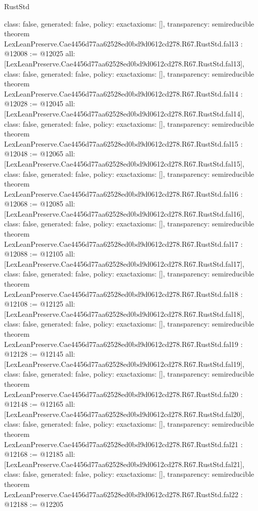 \begin{lexlean}{RustStd}
\begin{coremodule}
{  class: false,
  generated: false,
  policy: exact{axioms: []},
  transparency: semireducible
}
theorem LexLeanPreserve.Cae4456d77aa62528ed0bd9d0612cd278.R67.RustStd.fal13 : @12008 := @12025 {
  all: [LexLeanPreserve.Cae4456d77aa62528ed0bd9d0612cd278.R67.RustStd.fal13],
  class: false,
  generated: false,
  policy: exact{axioms: []},
  transparency: semireducible
}
theorem LexLeanPreserve.Cae4456d77aa62528ed0bd9d0612cd278.R67.RustStd.fal14 : @12028 := @12045 {
  all: [LexLeanPreserve.Cae4456d77aa62528ed0bd9d0612cd278.R67.RustStd.fal14],
  class: false,
  generated: false,
  policy: exact{axioms: []},
  transparency: semireducible
}
theorem LexLeanPreserve.Cae4456d77aa62528ed0bd9d0612cd278.R67.RustStd.fal15 : @12048 := @12065 {
  all: [LexLeanPreserve.Cae4456d77aa62528ed0bd9d0612cd278.R67.RustStd.fal15],
  class: false,
  generated: false,
  policy: exact{axioms: []},
  transparency: semireducible
}
theorem LexLeanPreserve.Cae4456d77aa62528ed0bd9d0612cd278.R67.RustStd.fal16 : @12068 := @12085 {
  all: [LexLeanPreserve.Cae4456d77aa62528ed0bd9d0612cd278.R67.RustStd.fal16],
  class: false,
  generated: false,
  policy: exact{axioms: []},
  transparency: semireducible
}
theorem LexLeanPreserve.Cae4456d77aa62528ed0bd9d0612cd278.R67.RustStd.fal17 : @12088 := @12105 {
  all: [LexLeanPreserve.Cae4456d77aa62528ed0bd9d0612cd278.R67.RustStd.fal17],
  class: false,
  generated: false,
  policy: exact{axioms: []},
  transparency: semireducible
}
theorem LexLeanPreserve.Cae4456d77aa62528ed0bd9d0612cd278.R67.RustStd.fal18 : @12108 := @12125 {
  all: [LexLeanPreserve.Cae4456d77aa62528ed0bd9d0612cd278.R67.RustStd.fal18],
  class: false,
  generated: false,
  policy: exact{axioms: []},
  transparency: semireducible
}
theorem LexLeanPreserve.Cae4456d77aa62528ed0bd9d0612cd278.R67.RustStd.fal19 : @12128 := @12145 {
  all: [LexLeanPreserve.Cae4456d77aa62528ed0bd9d0612cd278.R67.RustStd.fal19],
  class: false,
  generated: false,
  policy: exact{axioms: []},
  transparency: semireducible
}
theorem LexLeanPreserve.Cae4456d77aa62528ed0bd9d0612cd278.R67.RustStd.fal20 : @12148 := @12165 {
  all: [LexLeanPreserve.Cae4456d77aa62528ed0bd9d0612cd278.R67.RustStd.fal20],
  class: false,
  generated: false,
  policy: exact{axioms: []},
  transparency: semireducible
}
theorem LexLeanPreserve.Cae4456d77aa62528ed0bd9d0612cd278.R67.RustStd.fal21 : @12168 := @12185 {
  all: [LexLeanPreserve.Cae4456d77aa62528ed0bd9d0612cd278.R67.RustStd.fal21],
  class: false,
  generated: false,
  policy: exact{axioms: []},
  transparency: semireducible
}
theorem LexLeanPreserve.Cae4456d77aa62528ed0bd9d0612cd278.R67.RustStd.fal22 : @12188 := @12205 {
}
\end{coremodule}
\end{lexlean}
